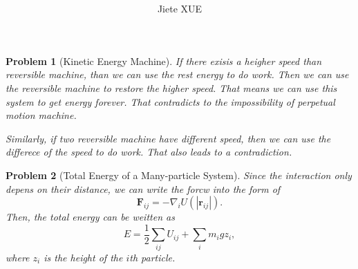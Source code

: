 \documentclass{article}
\title{\textbf{\mytitle}}
\author{Jiete XUE}
\date{\mydate}
\theoremstyle{1}
\newtheorem{problem}{Problem}
\begin{document}
\maketitle
\begin{problem}[Kinetic Energy Machine]
    If there exisis a heigher speed than reversible machine, than we can use the rest energy to do work. Then we can use the reversible machine to restore the higher speed. That means we can use this system to get energy forever. That contradicts to the impossibility of perpetual motion machine.

    Similarly, if two reversible machine have different speed, then we can use the differece of the speed to do work. That also leads to a contradiction.
\end{problem}
\begin{problem}[Total Energy of a Many-particle System]
    Since the interaction only depens on their distance, we can write the forcw into the form of 
    \begin{equation}
        \mathbf{F}_{ij}=-\nabla_i U\left(\left|\mathbf{r}_{ij}\right|\right).
    \end{equation}
    Then, the total energy can be weitten as
    \begin{equation}
        E=\frac{1}{2}\sum_{ij}U_{ij}+\sum_i m_ig z_i,
    \end{equation}
    where $z_i$ is the height of the $i$th particle.
    
\end{problem}
\end{document}
